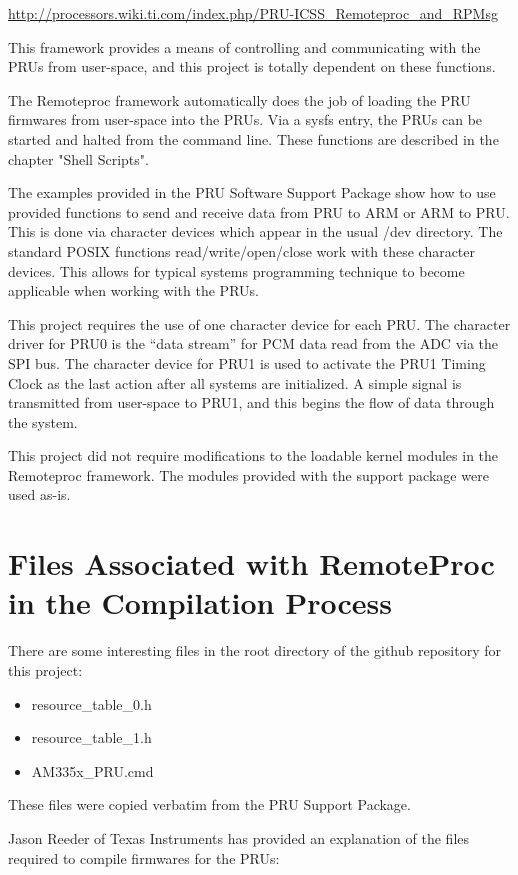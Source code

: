 \url{http://processors.wiki.ti.com/index.php/PRU-ICSS_Remoteproc_and_RPMsg}

This framework provides a means of controlling and communicating with the PRUs from user-space, and this project is totally dependent on these functions.

The Remoteproc framework automatically does the job of loading the PRU firmwares from user-space into the PRUs.  Via a sysfs entry, the PRUs can be started and halted from the command line.  These functions are described in the chapter "Shell Scripts".

The examples provided in the PRU Software Support Package show how to use provided functions to send and receive data from PRU to ARM or ARM to PRU.  This is done via character devices which appear in the usual /dev directory.  The standard POSIX functions read/write/open/close work with these character devices.  This allows for typical systems programming technique to become applicable when working with the PRUs.

This project requires the use of one character device for each PRU.  The character driver for PRU0 is the ``data stream'' for PCM data read from the ADC via the SPI bus.  The character device for PRU1 is used to activate the PRU1 Timing Clock as the last action after all systems are initialized.  A simple signal is transmitted from user-space to PRU1, and this begins the flow of data through the system.

This project did not require modifications to the loadable kernel modules in the Remoteproc framework.  The modules provided with the support package were used as-is.

\section{Files Associated with RemoteProc in the Compilation Process}

There are some interesting files in the root directory of the github repository for this project:

\begin{itemize}
\item resource\_table\_0.h
\item resource\_table\_1.h
\item AM335x\_PRU.cmd
\end{itemize}

These files were copied verbatim from the PRU Support Package.

Jason Reeder of Texas Instruments has provided an explanation of the files required to compile firmwares for the PRUs:

